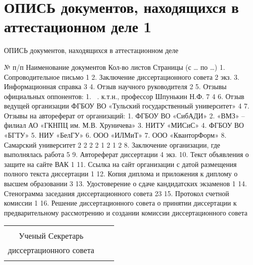 

\section{ОПИСЬ документов, находящихся в аттестационном деле 1}
ОПИСЬ
документов, находящихся в аттестационном деле
\thesisAuthorLastNameFromFull\

№
п/п	Наименование документов	Кол-во листов	Страницы
(с … по …)
1.		Сопроводительное письмо	1	
2.		Заключение диссертационного совета	2 экз.	
3.		Информационная справка	3	
4.		Отзыв научного руководителя	2	
5.		Отзывы официальных оппонентов:
1. \opponentOneRegaliaShort\ . к.т.н., профессор Шпунькин Н.Ф.	
7
4	
6.		Отзыв ведущей организации ФГБОУ ВО «Тульский государственный университет»	4	
7.		Отзывы на автореферат от организаций:
1. ФГБОУ ВО «СибАДИ»
2. «ВМЗ» – филиал АО «ГКНПЦ им. М.В. Хруничева»
3. НИТУ «МИСиС»
4. ФГБОУ ВО «БГТУ»
5. НИУ «БелГУ»
6. ООО «ИЛМиТ»
7. ООО «КванторФорм»
8. Самарский университет	
2
2
2
2
1
2
1
2	
8.		Заключение организации, где выполнялась работа	5	
9.		Автореферат диссертации	4 экз.	
10.		Текст объявления о защите на сайте ВАК	1	
11.		Ссылка на сайт организации с датой размещения полного текста диссертации	1	
12.		Копия диплома и приложения к диплому о высшем образовании	3	
13.		Удостоверение о сдаче кандидатских экзаменов	1	
14.		Стенограмма заседания диссертационного совета	23	
15.		Протокол счетной комиссии	1	
16.		Решение диссертационного совета о принятии диссертации к предварительному рассмотрению и создании комиссии диссертационного совета		


\begin{center}
	\begin{tabular}[c]{c m{4cm} l}
		&            &                     \\
		Ученый Секретарь     &            &                     \\
		диссертационного совета & \hrulefill & \dcSecretaryFullFIO \\
		\dcSecretaryRegalia   &            &
	\end{tabular}
\end{center}

\clearpage